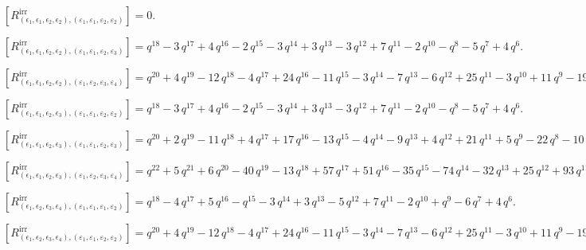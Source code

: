 \documentclass[10pt,a4paper]{amsart}
\begin{document}
$[R_{(\epsilon_1,\epsilon_1,\epsilon_2,\epsilon_2),(\varepsilon_1,\varepsilon_1,\varepsilon_2,\varepsilon_2)}^{\textrm{irr}}] = 0 .$

$[R_{(\epsilon_1,\epsilon_1,\epsilon_2,\epsilon_2),(\varepsilon_1,\varepsilon_1,\varepsilon_2,\varepsilon_3)}^{\textrm{irr}}] = q^{18} - 3 \, q^{17} + 4 \, q^{16} - 2 \, q^{15} - 3 \, q^{14} + 3 \, q^{13} - 3 \, q^{12} + 7 \, q^{11} - 2 \, q^{10} - q^{8} - 5 \, q^{7} + 4 \, q^{6} .$

$[R_{(\epsilon_1,\epsilon_1,\epsilon_2,\epsilon_2),(\varepsilon_1,\varepsilon_2,\varepsilon_3,\varepsilon_4)}^{\textrm{irr}}] = q^{20} + 4 \, q^{19} - 12 \, q^{18} - 4 \, q^{17} + 24 \, q^{16} - 11 \, q^{15} - 3 \, q^{14} - 7 \, q^{13} - 6 \, q^{12} + 25 \, q^{11} - 3 \, q^{10} + 11 \, q^{9} - 19 \, q^{8} - 18 \, q^{7} + 18 \, q^{6} .$

$[R_{(\epsilon_1,\epsilon_1,\epsilon_2,\epsilon_3),(\varepsilon_1,\varepsilon_1,\varepsilon_2,\varepsilon_2)}^{\textrm{irr}}] = q^{18} - 3 \, q^{17} + 4 \, q^{16} - 2 \, q^{15} - 3 \, q^{14} + 3 \, q^{13} - 3 \, q^{12} + 7 \, q^{11} - 2 \, q^{10} - q^{8} - 5 \, q^{7} + 4 \, q^{6} .$

$[R_{(\epsilon_1,\epsilon_1,\epsilon_2,\epsilon_3),(\varepsilon_1,\varepsilon_1,\varepsilon_2,\varepsilon_3)}^{\textrm{irr}}] = q^{20} + 2 \, q^{19} - 11 \, q^{18} + 4 \, q^{17} + 17 \, q^{16} - 13 \, q^{15} - 4 \, q^{14} - 9 \, q^{13} + 4 \, q^{12} + 21 \, q^{11} + 5 \, q^{9} - 22 \, q^{8} - 10 \, q^{7} + 15 \, q^{6} .$

$[R_{(\epsilon_1,\epsilon_1,\epsilon_2,\epsilon_3),(\varepsilon_1,\varepsilon_2,\varepsilon_3,\varepsilon_4)}^{\textrm{irr}}] = q^{22} + 5 \, q^{21} + 6 \, q^{20} - 40 \, q^{19} - 13 \, q^{18} + 57 \, q^{17} + 51 \, q^{16} - 35 \, q^{15} - 74 \, q^{14} - 32 \, q^{13} + 25 \, q^{12} + 93 \, q^{11} + 38 \, q^{10} - 30 \, q^{9} - 82 \, q^{8} - 18 \, q^{7} + 48 \, q^{6} .$

$[R_{(\epsilon_1,\epsilon_2,\epsilon_3,\epsilon_4),(\varepsilon_1,\varepsilon_1,\varepsilon_1,\varepsilon_2)}^{\textrm{irr}}] = q^{18} - 4 \, q^{17} + 5 \, q^{16} - q^{15} - 3 \, q^{14} + 3 \, q^{13} - 5 \, q^{12} + 7 \, q^{11} - 2 \, q^{10} + q^{9} - 6 \, q^{7} + 4 \, q^{6} .$

$[R_{(\epsilon_1,\epsilon_2,\epsilon_3,\epsilon_4),(\varepsilon_1,\varepsilon_1,\varepsilon_2,\varepsilon_2)}^{\textrm{irr}}] = q^{20} + 4 \, q^{19} - 12 \, q^{18} - 4 \, q^{17} + 24 \, q^{16} - 11 \, q^{15} - 3 \, q^{14} - 7 \, q^{13} - 6 \, q^{12} + 25 \, q^{11} - 3 \, q^{10} + 11 \, q^{9} - 19 \, q^{8} - 18 \, q^{7} + 18 \, q^{6} .$
\end{document}
